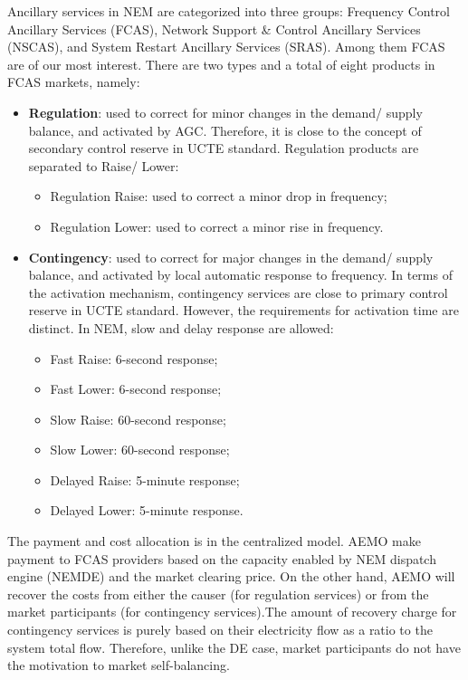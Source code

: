 Ancillary services in NEM are categorized into three groups: Frequency Control Ancillary Services (FCAS), Network Support \& Control Ancillary Services (NSCAS), and System Restart Ancillary Services (SRAS). Among them FCAS are of our most interest. There are two types and a total of eight products in FCAS markets, namely:
\begin{itemize}
	\item \textbf{Regulation}: used to correct for minor changes in the demand/ supply balance, and activated by AGC. Therefore, it is close to the concept of secondary control reserve in UCTE standard. Regulation products are separated to Raise/ Lower:
	\begin{itemize}
		\item Regulation Raise: used to correct a minor drop in frequency;
		\item Regulation Lower: used to correct a minor rise in frequency.
	\end{itemize}
	\item \textbf{Contingency}: used to correct for major changes in the demand/ supply balance, and activated by local automatic response to frequency. In terms of the activation mechanism, contingency services are close to primary control reserve in UCTE standard. However, the requirements for activation time are distinct. In NEM, slow and delay response are allowed:
	\begin{itemize}
		\item Fast Raise: 6-second response;
		\item Fast Lower: 6-second response;
		\item Slow Raise: 60-second response;
		\item Slow Lower: 60-second response;
		\item Delayed Raise: 5-minute response;
		\item Delayed Lower: 5-minute response.
	\end{itemize}
\end{itemize}

The payment and cost allocation is in the centralized model. AEMO make payment to FCAS providers based on the capacity enabled by NEM dispatch engine (NEMDE) and the market clearing price. On the other hand, AEMO will recover the costs from either the causer (for regulation services) or from the market participants (for contingency services).The amount of recovery charge for contingency services is purely based on their electricity flow as a ratio to the system total flow. Therefore, unlike the DE case, market participants do not have the motivation to market self-balancing.

